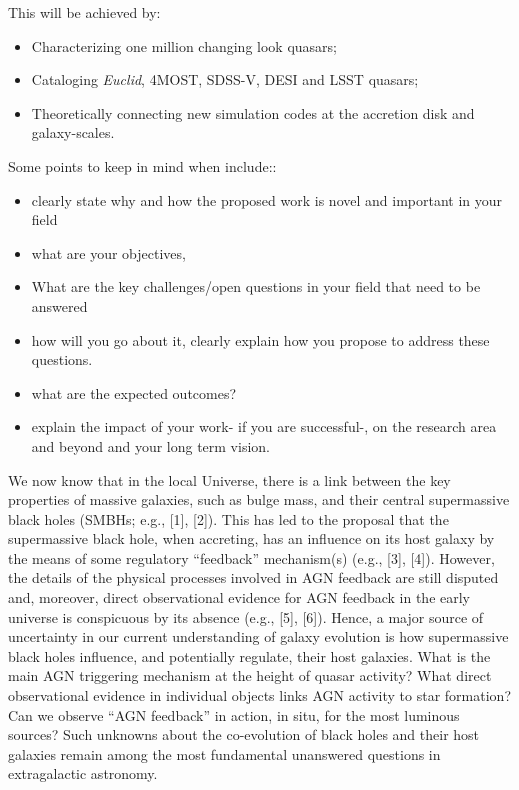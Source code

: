 \documentclass[oneside, a4paper, onecolumn, 11pt]{article}
\begin{document}
This will be achieved by:
\begin{itemize}
\item Characterizing one million changing look quasars;
\item Cataloging {\it Euclid}, 4MOST, SDSS-V, DESI and LSST quasars; 
\item Theoretically connecting new simulation codes at the accretion disk and galaxy-scales. 
\end{itemize}

Some points to keep in mind when include::
\begin{itemize}
\item clearly state why and how the proposed work is novel and important in your field
\item what are your objectives,
\item What are the key challenges/open questions in your field that need to be answered 
\item how will you go about it, clearly explain how you propose to address these questions. 
\item what are the expected outcomes?
\item  explain the impact of your work- if you are successful-, on the research area and beyond and your long term vision.
\end{itemize}



\smallskip 
\smallskip
\noindent
We now know that in the local Universe, there is a link between the
key properties of massive galaxies, such as bulge mass, and their
central supermassive black holes (SMBHs; e.g., [1], [2]). This has led
to the proposal that the supermassive black hole, when accreting, has
an influence on its host galaxy by the means of some regulatory
``feedback'' mechanism(s) (e.g., [3], [4]). However, the details of
the physical processes involved in AGN feedback are still disputed
and, moreover, direct observational evidence for AGN feedback in the
early universe is conspicuous by its absence (e.g., [5], [6]). Hence,
a major source of uncertainty in our current understanding of galaxy
evolution is how supermassive black holes influence, and potentially
regulate, their host galaxies.
What is the main AGN triggering mechanism at the height of quasar
activity? What direct observational evidence in individual objects
links AGN activity to star formation?  Can we observe ``AGN feedback''
in action, in situ, for the most luminous sources?  Such unknowns
about the co-evolution of black holes and their host galaxies remain
among the most fundamental unanswered questions in extragalactic
astronomy.
\end{document}
